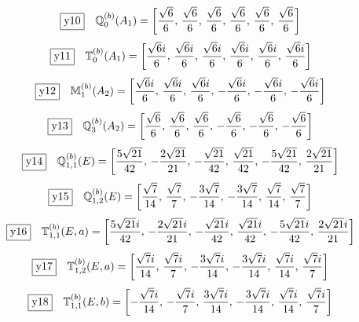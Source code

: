 \documentclass[fleqn,10pt,landscape]{jsarticle}
\begin{document}
\begin{dmath*}
\fbox{y10}\quad \mathbb{Q}_{0}^{(b)}(A_{1})=\left[ \frac{\sqrt{6}}{6},\, \frac{\sqrt{6}}{6},\, \frac{\sqrt{6}}{6},\, \frac{\sqrt{6}}{6},\, \frac{\sqrt{6}}{6},\, \frac{\sqrt{6}}{6} \right]
\end{dmath*}
\begin{dmath*}
\fbox{y11}\quad \mathbb{T}_{0}^{(b)}(A_{1})=\left[ \frac{\sqrt{6} i}{6},\, \frac{\sqrt{6} i}{6},\, \frac{\sqrt{6} i}{6},\, \frac{\sqrt{6} i}{6},\, \frac{\sqrt{6} i}{6},\, \frac{\sqrt{6} i}{6} \right]
\end{dmath*}
\begin{dmath*}
\fbox{y12}\quad \mathbb{M}_{1}^{(b)}(A_{2})=\left[ \frac{\sqrt{6} i}{6},\, \frac{\sqrt{6} i}{6},\, \frac{\sqrt{6} i}{6},\, - \frac{\sqrt{6} i}{6},\, - \frac{\sqrt{6} i}{6},\, - \frac{\sqrt{6} i}{6} \right]
\end{dmath*}
\begin{dmath*}
\fbox{y13}\quad \mathbb{Q}_{3}^{(b)}(A_{2})=\left[ \frac{\sqrt{6}}{6},\, \frac{\sqrt{6}}{6},\, \frac{\sqrt{6}}{6},\, - \frac{\sqrt{6}}{6},\, - \frac{\sqrt{6}}{6},\, - \frac{\sqrt{6}}{6} \right]
\end{dmath*}
\begin{dmath*}
\fbox{y14}\quad \mathbb{Q}_{1,1}^{(b)}(E)=\left[ \frac{5 \sqrt{21}}{42},\, - \frac{2 \sqrt{21}}{21},\, - \frac{\sqrt{21}}{42},\, \frac{\sqrt{21}}{42},\, - \frac{5 \sqrt{21}}{42},\, \frac{2 \sqrt{21}}{21} \right]
\end{dmath*}
\begin{dmath*}
\fbox{y15}\quad \mathbb{Q}_{1,2}^{(b)}(E)=\left[ \frac{\sqrt{7}}{14},\, \frac{\sqrt{7}}{7},\, - \frac{3 \sqrt{7}}{14},\, - \frac{3 \sqrt{7}}{14},\, \frac{\sqrt{7}}{14},\, \frac{\sqrt{7}}{7} \right]
\end{dmath*}
\begin{dmath*}
\fbox{y16}\quad \mathbb{T}_{1,1}^{(b)}(E,a)=\left[ \frac{5 \sqrt{21} i}{42},\, - \frac{2 \sqrt{21} i}{21},\, - \frac{\sqrt{21} i}{42},\, \frac{\sqrt{21} i}{42},\, - \frac{5 \sqrt{21} i}{42},\, \frac{2 \sqrt{21} i}{21} \right]
\end{dmath*}
\begin{dmath*}
\fbox{y17}\quad \mathbb{T}_{1,2}^{(b)}(E,a)=\left[ \frac{\sqrt{7} i}{14},\, \frac{\sqrt{7} i}{7},\, - \frac{3 \sqrt{7} i}{14},\, - \frac{3 \sqrt{7} i}{14},\, \frac{\sqrt{7} i}{14},\, \frac{\sqrt{7} i}{7} \right]
\end{dmath*}
\begin{dmath*}
\fbox{y18}\quad \mathbb{T}_{1,1}^{(b)}(E,b)=\left[ - \frac{\sqrt{7} i}{14},\, - \frac{\sqrt{7} i}{7},\, \frac{3 \sqrt{7} i}{14},\, - \frac{3 \sqrt{7} i}{14},\, \frac{\sqrt{7} i}{14},\, \frac{\sqrt{7} i}{7} \right]
\end{dmath*}
\end{document}
